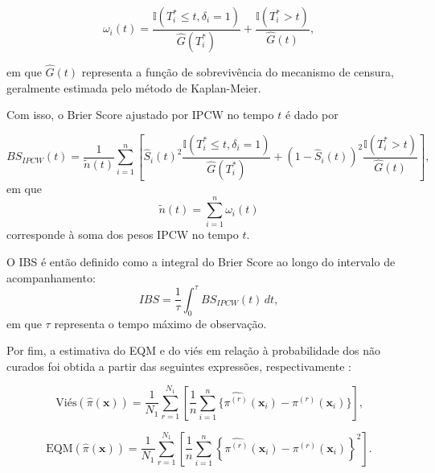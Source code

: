 \[
\omega_i(t)=
\frac{\mathbb{I}(T_i^*\leq t,\delta_i=1)}{\hat{G}(T_i^*)}
+
\frac{\mathbb{I}(T_i^*>t)}{\hat{G}(t)},
\]

em que $\hat{G}(t)$ representa a função de sobrevivência do mecanismo de censura, geralmente estimada pelo método de Kaplan-Meier.

Com isso, o Brier Score ajustado por IPCW no tempo $t$ é dado por

\[
BS_{IPCW}(t)
=
\frac{1}{\tilde{n}(t)}
\sum_{i=1}^{n}
\left[
\hat{S}_i(t)^2
\frac{\mathbb{I}(T_i^*\leq t,\delta_i=1)}{\hat{G}(T_i^*)}
+
(1-\hat{S}_i(t))^2
\frac{\mathbb{I}(T_i^*>t)}{\hat{G}(t)}
\right],
\]
em que
\[
\tilde{n}(t)=\sum_{i=1}^{n}\omega_i(t)
\]
corresponde à soma dos pesos IPCW no tempo $t$.


O IBS é então definido como a integral do Brier Score ao longo do intervalo de acompanhamento:
\[
IBS=
\frac{1}{\tau}
\int_0^\tau BS_{IPCW}(t)\,dt,
\]
em que $\tau$ representa o tempo máximo de observação.

Por fim, a estimativa do EQM e do viés em relação à probabilidade dos não curados foi obtida a partir das seguintes expressões, respectivamente \cite{pal2023semiparametric}:

$$
\text{Viés}\left(\widehat{\pi}\left(\mathbf{x}\right)\right) =
\frac{1}{N_1} \sum_{r=1}^{N_1} \left[\frac{1}{n}\sum_{i=1}^{n}\{\hat{\pi^{\left(r\right)}}\left(\mathbf{x}_i\right) -
\pi^{\left(r\right)}\left(\mathbf{x}_i\right)\}\right]\text{,}
$$

$$
\text{EQM}\left(\widehat{\pi}\left(\mathbf{x}\right)\right) = \frac{1}{N_1} \sum_{r=1}^{N_1} \left[\frac{1}{n}\sum_{i=1}^{n}\left\{\hat{\pi^{\left(r\right)}}\left(\mathbf{x}_i\right) - \pi^{\left(r\right)}\left(\mathbf{x}_i\right)\right\}^2\right]\text{.}
$$





